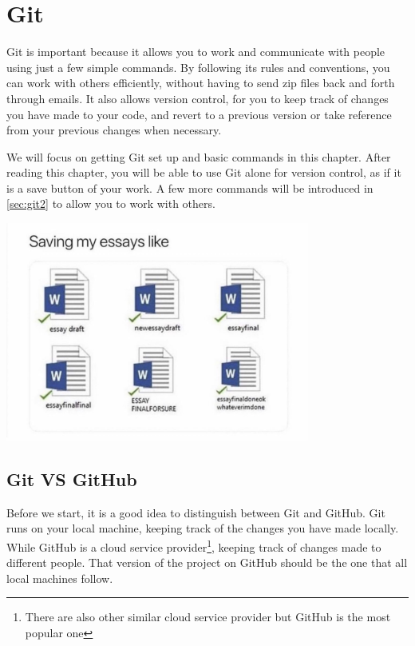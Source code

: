 \chapter{Git}
\label{sec:ch3}

Git is important because it allows you to work and communicate with people using just a few simple commands. By following its rules and conventions, you can work with others efficiently, without having to send zip files back and forth through emails. It also allows version control, for you to keep track of changes you have made to your code, and revert to a previous version or take reference from your previous changes when necessary.
\vspace{6mm}

We will focus on getting Git set up and basic commands in this chapter. After reading this chapter, you will be able to use Git alone for version control, as if it is a save button of your work. A few more commands will be introduced in \cref{sec:git2} to allow you to work with others.

\begin{center}
\includegraphics[width=10cm]{images/ch0-version-control.jpeg}
\end{center}

\section{Git VS GitHub}

Before we start, it is a good idea to distinguish between Git and GitHub. Git runs on your local machine, keeping track of the changes you have made locally. While GitHub is a cloud service provider\footnote{There are also other similar cloud service provider but GitHub is the most popular one}, keeping track of changes made to different people. That version of the project on GitHub should be the one that all local machines follow.

